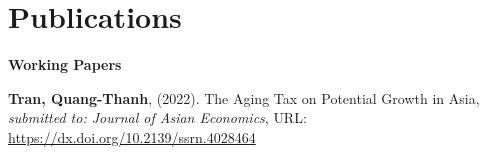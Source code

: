 
\section{\sc Publications}
{\bf Working Papers}
\vspace*{.05in}
\begin{etaremune}[]
\item
  {\bf Tran, Quang-Thanh},
  (2022).
  {The Aging Tax on Potential Growth in Asia},
  {\it submitted to: Journal of Asian Economics},
  {URL: \url{https://dx.doi.org/10.2139/ssrn.4028464}}
\end{etaremune}


